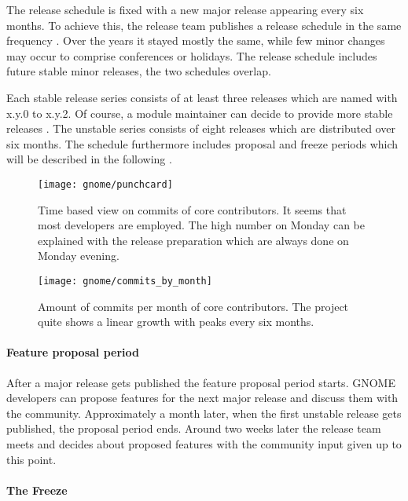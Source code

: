 The release schedule is fixed with a new major release appearing every six
months. To achieve this, the release team publishes a release schedule in the
same frequency \cite{GNOMEDevelopmentSchedule}. Over the years it stayed mostly
the same, while few minor changes may occur to comprise conferences or
holidays. The release schedule includes future stable minor releases, the two
schedules overlap.

Each stable release series consists of at least three releases which are named
with x.y.0 to x.y.2. Of course, a module maintainer can decide to provide more
stable releases \cite{GNOMEReleaseTeam}. The unstable series consists of eight
releases which are distributed over six months. The schedule furthermore
includes proposal and freeze periods which will be described in the following
\cite{GNOMEDevelopmentSchedule,GNOMESchedule}.

\begin{figure}[hbtp]
  \centering
  \texttt{[image: gnome/punchcard]}
  \caption[Time Based View on Commits, GNOME]
  {Time based view on commits of core contributors. It seems that most
    developers are employed. The high number on Monday can be explained with
    the release preparation which are always done on Monday evening.}
\end{figure}

\begin{figure}[htbp]
  \centering
  \texttt{[image: gnome/commits\_by\_month]}
  \caption[Commits by Month, GNOME]
  {Amount of commits per month of core contributors. The project quite shows a
    linear growth with peaks every six months.}
\end{figure}

\paragraph{Feature proposal period}

After a major release gets published the feature proposal period starts. GNOME
developers can propose features for the next major release and discuss them
with the community. Approximately a month later, when the first unstable
release gets published, the proposal period ends. Around two weeks later the
release team meets and decides about proposed features with the community input
given up to this point.

\paragraph{The Freeze}

